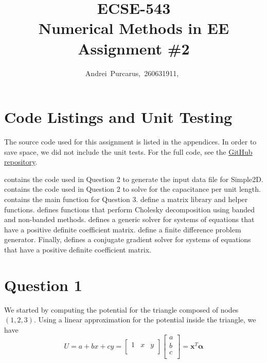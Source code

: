 \documentclass[journal,hidelinks]{IEEEtran}
\title{ECSE-543 \\ Numerical Methods in EE \\ Assignment \#2}
\author{Andrei~Purcarus,~260631911,~\IEEEmembership{McGill~University}}
\begin{document}
\sloppy

\maketitle

\section*{Code Listings and Unit Testing}

The source code used for this assignment is listed in the appendices. In order to save space, we did not include the unit tests. For the full code, see the \href{https://github.com/Gripnook/ECSE543-F17-A2}{GitHub repository}.

 contains the code used in Question 2 to generate the input data file for Simple2D.  contains the code used in Question 2 to solve for the capacitance per unit length.  contains the main function for Question 3.  define a matrix library and helper functions.  defines functions that perform Cholesky decomposition using banded and non-banded methods.  defines a generic solver for systems of equations that have a positive definite coefficient matrix.  define a finite difference problem generator. Finally,  defines a conjugate gradient solver for systems of equations that have a positive definite coefficient matrix.

\section*{Question 1}

We started by computing the potential for the triangle composed of nodes $(1,2,3)$. Using a linear approximation for the potential inside the triangle, we have
\begin{equation}
\label{eq:potential}
U = a + b x + c y =
\begin{bmatrix}
1 & x & y \\
\end{bmatrix}
\begin{bmatrix}
a \\
b \\
c \\
\end{bmatrix}
= \boldsymbol{x}^T \boldsymbol{\alpha}
\end{equation}
\end{document}
